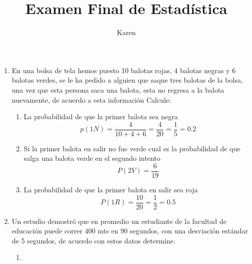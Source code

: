 \documentclass[10pt,a4paper]{article}
\author{Karen}
\title{Examen Final de Estadística}
\begin{document}
\maketitle
\begin{enumerate}
\item En una bolsa de tela hemos puesto 10 balotas rojas, 4 balotas negras y 6 balotas verdes, se le ha pedido a alguien que saque tres balotas de la bolsa, una vez que esta persona saca una balota, esta no regresa a la balota nuevamente, de acuerdo a esta información Calcule:
\begin{enumerate}
\item La probabilidad de que la primer balota sea negra
\[p(1N)=\dfrac{4}{10+4+6}=\dfrac{4}{20}=\dfrac{1}{5}=0.2\]
\item Si la primer balota en salir no fue verde cual es la probabilidad de que salga una balota verde en el segundo intento
\[P(2V)=\dfrac{6}{19}\]
\item La probabilidad de que la primer balota en salir sea roja
\[P(1R)=\dfrac{10}{20}=\dfrac{1}{2}=0.5\]
\end{enumerate}
\item Un estudio demostró que en promedio un estudiante de la facultad de educación puede correr 400 mts en 90 segundos, con una desviación estándar de 5 segundos, de acuerdo con estos datos determine.
\begin{enumerate}
\item 
\end{enumerate}
\end{enumerate}
\end{document}
